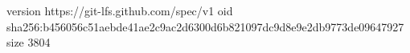 version https://git-lfs.github.com/spec/v1
oid sha256:b456056c51aebde41ae2c9ac2d6300d6b821097dc9d8e9e2db9773de09647927
size 3804
